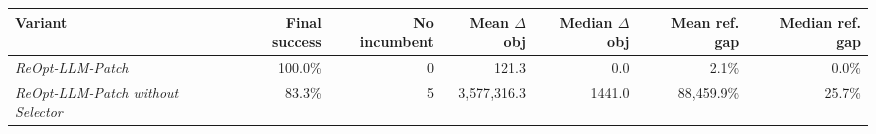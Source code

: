 \begin{tabular}{lrrrrrr}
\toprule
\textbf{Variant} & \textbf{Final success} & \textbf{No incumbent} & \textbf{Mean $\Delta$obj} & \textbf{Median $\Delta$obj} & \textbf{Mean ref. gap} & \textbf{Median ref. gap} \\
\midrule
\emph{ReOpt-LLM-Patch} & 100.0\% & 0 & 121.3 & 0.0 & 2.1\% & 0.0\% \\
\emph{ReOpt-LLM-Patch without Selector} & 83.3\% & 5 & 3{,}577{,}316.3 & 1441.0 & 88{,}459.9\% & 25.7\% \\
\bottomrule
\end{tabular}
